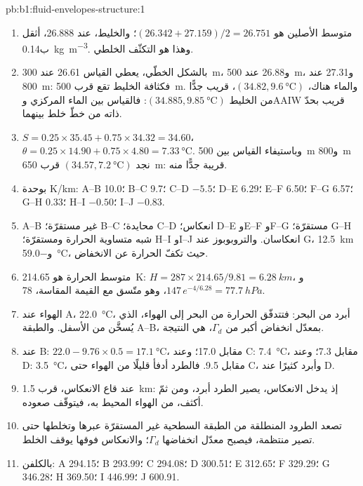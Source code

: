 \begin{solution}{pb:b1:fluid-envelopes-structure:1}
\begin{enumerate}
  \item متوسط الأصلين هو $(26.342 + 27.159)/2 = 26.751$؛ والخليط، عند 26.888، أثقل ب\qty{0.14}{kg.m^{-3}}. وهذا هو التكثّف الخلطي.
  \item بالشكل الخطّي، يعطي القياس 26.61 عند \qty{300}{m}، و\num{26.88} عند
        \qty{500}{m}، و\num{27.31} عند \qty{800}{m}: فكثافة الخليط تقع قرب
        \qty{500}{m}. والماء هناك، $(34.82, \qty{9.6}{\celsius})$، قريب جدًّا من الخليط $(34.885, \qty{9.85}{\celsius})$: فالقياس بين الماء المركزي وAAIW قريب بحدّ ذاته من خطّ خلط بينهما.
  \item $S = 0.25 \times 35.45 + 0.75 \times 34.32 = 34.60$، $\theta = 0.25
        \times 14.90 + 0.75 \times 4.80 = \qty{7.33}{\celsius}$. وباستيفاء القياس بين \qty{500}{m} و\qty{800}{m} نجد
        $(34.57, \qty{7.2}{\celsius})$ قرب \qty{650}{m}: قريبة جدًّا منه.
  \item بوحدة \si{K/km}: A--B 10.0؛ B--C 9.7؛ C--D $-5.5$؛ D--E 6.29؛ E--F 6.50؛
        F--G 6.57؛ G--H 0.33؛ H--I $-0.50$؛ I--J $-0.83$.
  \item A--B غير مستقرّة؛ B--C محايدة؛ C--D انعكاس؛ D--E وE--F وF--G مستقرّة؛
        G--H شبه متساوية الحرارة ومستقرّة؛ H--I وI--J انعكاسان. والتروبوبوز عند G، \qty{12.5}{km} و\qty{-59.0}{\celsius}، حيث تكفّ الحرارة عن الانخفاض.
  \item متوسط الحرارة هو \qty{214.65}{K}: $H = 287 \times 214.65/9.81 =
        \qty{6.28}{km}$، و$147\,e^{-4/6.28} = \qty{77.7}{hPa}$، وهو متّسق مع القيمة المقاسة، 78.
  \item الهواء عند A، \qty{22.0}{\celsius}، أبرد من البحر: فتتدفّق الحرارة من البحر إلى الهواء، الذي يُسخَّن من الأسفل. والطبقة A--B، بمعدّل انخفاض أكبر من $\Gamma_d$، هي النتيجة.
  \item عند B: $22.0 - 9.76 \times 0.5 = \qty{17.1}{\celsius}$، مقابل 17.0؛ وعند
        C: \qty{7.4}{\celsius}، مقابل 7.3؛ وعند D: \qty{3.5}{\celsius}، مقابل
        9.5. فالطرد أدفأ قليلًا من الهواء حتى C، وأبرد كثيرًا عند D.
  \item عند قاع الانعكاس، قرب \qty{1.5}{km}: إذ يدخل الانعكاس، يصير الطرد أبرد، ومن ثمّ أكثف، من الهواء المحيط به، فيتوقّف صعوده.
  \item تصعد الطرود المنطلقة من الطبقة السطحية غير المستقرّة عبرها وتخلطها حتى تصير  منتظمة، فيصبح معدّل انخفاضها $\Gamma_d$؛ والانعكاس فوقها يوقف الخلط.
  \item بالكلفن: A 294.15؛ B 293.99؛ C 294.08؛ D 300.51؛ E 312.65؛ F 329.29؛ G
        346.28؛ H 369.50؛ I 446.99؛ J 600.91.

\end{enumerate}
\end{solution}
